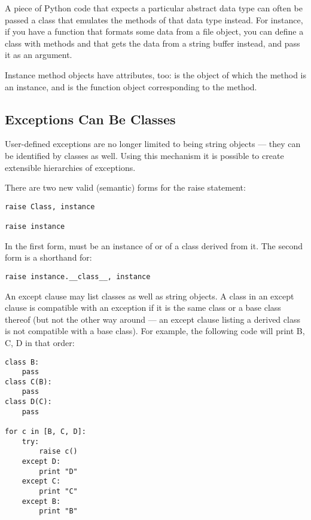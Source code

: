 \documentclass{manual}
\begin{document}
A piece of Python code that expects a particular abstract data type
can often be passed a class that emulates the methods of that data
type instead.  For instance, if you have a function that formats some
data from a file object, you can define a class with methods
 and  that gets the data from a string
buffer instead, and pass it as an argument.%


Instance method objects have attributes, too:  is the
object of which the method is an instance, and  is the
function object corresponding to the method.

\subsection{Exceptions Can Be Classes \label{exceptionClasses}}

User-defined exceptions are no longer limited to being string objects
--- they can be identified by classes as well.  Using this mechanism it
is possible to create extensible hierarchies of exceptions.

There are two new valid (semantic) forms for the raise statement:

\begin{verbatim}
raise Class, instance

raise instance
\end{verbatim}

In the first form,  must be an instance of
 or of a class derived from it.  The second form is a
shorthand for:

\begin{verbatim}
raise instance.__class__, instance
\end{verbatim}

An except clause may list classes as well as string objects.  A class
in an except clause is compatible with an exception if it is the same
class or a base class thereof (but not the other way around --- an
except clause listing a derived class is not compatible with a base
class).  For example, the following code will print B, C, D in that
order:

\begin{verbatim}
class B:
    pass
class C(B):
    pass
class D(C):
    pass

for c in [B, C, D]:
    try:
        raise c()
    except D:
        print "D"
    except C:
        print "C"
    except B:
        print "B"
\end{verbatim}
\end{document}
